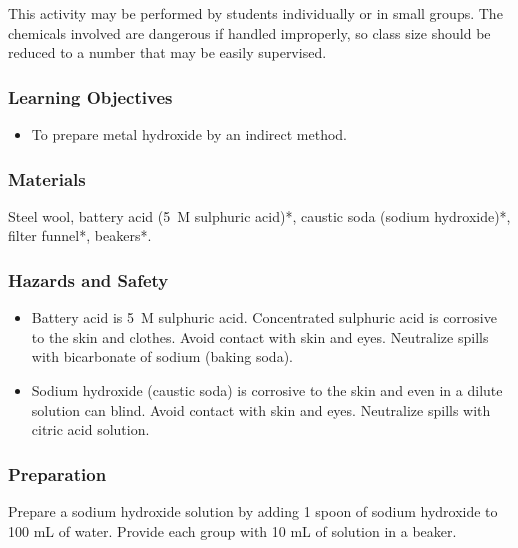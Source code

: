 This activity may be performed by students individually or in small groups. The chemicals involved are dangerous if handled improperly, so class size should be reduced to a number that may be easily supervised.

\subsubsection*{Learning Objectives}
\begin{itemize}
\item{To prepare metal hydroxide by an indirect method.}
\end{itemize}

\subsubsection*{Materials}
Steel wool, battery acid (5~M sulphuric acid)*, caustic soda (sodium hydroxide)*, filter funnel*, beakers*.

\subsubsection*{Hazards and Safety}
\begin{itemize}
\item{Battery acid is 5~M sulphuric acid. Concentrated sulphuric acid is corrosive to the skin and clothes. Avoid contact with skin and eyes. Neutralize spills with bicarbonate of sodium (baking soda).}
\item{Sodium hydroxide (caustic soda) is corrosive to the skin and even in a dilute solution can blind. Avoid contact with skin and eyes. Neutralize spills with citric acid solution.}
\end{itemize}

\subsubsection*{Preparation}
Prepare a sodium hydroxide solution by adding 1 spoon of sodium hydroxide to 100 mL of water. Provide each group with 10 mL of solution in a beaker.

